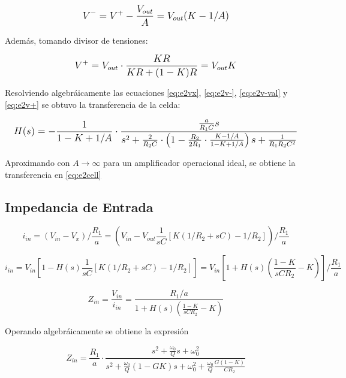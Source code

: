 \begin{equation}
\mathlarger{
V^-=V^+ - \frac{V_{out}}{A} = V_{out} (K - 1/A)
}
\label{eq:e2v-val}
\end{equation}

Además, tomando divisor de tensiones:

\begin{equation}
\mathlarger{
V^+=V_{out}\cdot\frac{KR}{KR+(1-K)R}=V_{out}K
}
\label{eq:e2v+}
\end{equation}

Resolviendo algebráicamente las ecuaciones \eqref{eq:e2vx}, \eqref{eq:e2v-}, \eqref{eq:e2v-val} y \eqref{eq:e2v+} se obtuvo la transferencia de la celda:

\begin{equation}
\mathlarger{
H(s)=-\frac{1}{1-K+1/A} \cdot \frac{\frac{a}{R_1C}s}{s^2 + \frac{2}{R_2 C}\cdot \left(1-\frac{R_2}{2 R_1}\cdot \frac{K-1/A}{1-K+1/A} \right)s + \frac{1}{R_1R_2C^2}}
}
\label{eq:e2 cell avol}
\end{equation}

Aproximando con $A\rightarrow \infty$ para un amplificador operacional ideal, se obtiene la transferencia en \eqref{eq:e2cell}

\subsection{Impedancia de Entrada}

\begin{equation}
i_{in} = \left(V_{in} - V_x \right) / \frac{R_1}{a} = \left( V_{in} - V_{out} \frac{1}{sC} \left[ K(1/R_2 + sC) - 1/R_2 \right]\right)/\frac{R_1}{a}
\end{equation}

\begin{equation*}
i_{in} = V_{in} \left[1- H(s) \frac{1}{sC} \left[ K(1/R_2+sC) - 1/R_2 \right] \right]=V_{in} \left[1+ H(s) \left(\frac{1-K}{sCR_2} - K \right) \right]/\frac{R_1}{a}
\end{equation*}

\begin{equation}
Z_{in} = \frac{V_{in}}{i_{in}}= \frac{R_1/a}{1+H(s) \left(\frac{1-K}{sCR_2} - K \right)}
\end{equation}

Operando algebráicamente se obtiene la expresión

\begin{equation*}
Z_{in} = \frac{R_1}{a} \cdot \frac{s^2 + \frac{\omega_0}{Q}s + \omega_0^2}{s^2 + \frac{\omega_0}{Q}(1-GK) s + \omega_0^2 + \frac{\omega_0}{Q} \frac{G(1-K)}{C R_2}}
\end{equation*}

